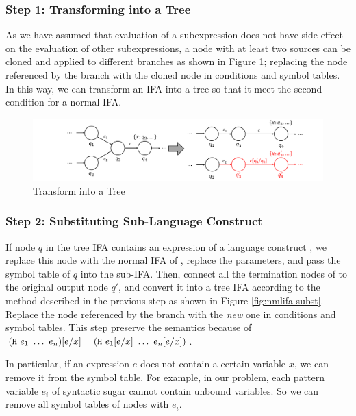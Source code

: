 \subsubsection*{Step 1: Transforming into a Tree}

As we have assumed that evaluation of a subexpression does not have side effect on the evaluation of other subexpressions, a node with at least two sources can be cloned and applied to different branches as shown in Figure \ref{fig:nmlifa-tree}; replacing the node referenced by the branch with the cloned node in conditions and symbol tables.  In this way, we can transform an IFA into a tree so that it meet the second condition for a  normal IFA.

\begin{figure}[t]
    \centering
    \includegraphics[scale=0.25]{images/nmlifa/nmlifa-tree.png}
    \caption{Transform into a Tree}
    \label{fig:nmlifa-tree}
\end{figure}

\subsubsection*{Step 2: Substituting Sub-Language Construct}
\label{mark:hygieneinderive}

If node $q$ in the tree IFA contains an expression of a language construct , we replace this node with the normal IFA of , replace the parameters, and pass the symbol table of $q$ into the sub-IFA. Then, connect all the termination nodes of  to the original output node $q'$, and convert it into a tree IFA according to the method described in the previous step as shown in Figure \ref{fig:nmlifa-subst}. Replace the node referenced by the branch with the \textit{new} one in conditions and symbol tables. This step preserve the semantics because of $(\mbox{\tt H}~e_1~\ldots~e_n)[e/x] = (\mbox{\tt H}~e_1[e/x]~\ldots~e_n[e/x])$.

In particular, if an expression $e$ does not contain a certain variable $x$, we can remove it from the symbol table. For example, in our problem, each pattern variable $e_i$ of syntactic sugar cannot contain unbound variables. So we can remove all symbol tables of nodes with $e_i$.

